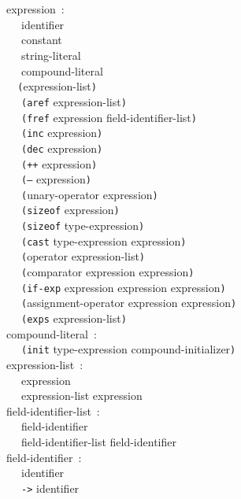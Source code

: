 \documentclass[a4]{article}
\def\|{\verb|} %|
\begin{document}
\noindent
expression{\rm \ :} \\
\|  | identifier \\
\|  | constant \\
\|  | string-literal \\
\|  | compound-literal \\
\|  | {\tt (}expression-list{\tt )} \\
\|  | {\tt (aref} expression-list{\tt )} \\
\|  | {\tt (fref} expression field-identifier-list{\tt )} \\
\|  | {\tt (inc} expression{\tt )} \\
\|  | {\tt (dec} expression{\tt )} \\
\|  | {\tt (++} expression{\tt )} \\
\|  | {\tt (--} expression{\tt )} \\
\|  | {\tt (}unary-operator expression{\tt )} \\
\|  | {\tt (sizeof} expression{\tt )} \\
\|  | {\tt (sizeof} type-expression{\tt )} \\
\|  | {\tt (cast} type-expression expression{\tt )} \\
\|  | {\tt (}operator expression-list{\tt )} \\
\|  | {\tt (}comparator expression expression{\tt )} \\
\|  | {\tt (if-exp} expression expression expression{\tt )} \\
\|  | {\tt (}assignment-operator expression expression{\tt )} \\
\|  | {\tt (exps} expression-list{\tt )} \\

\noindent
compound-literal{\rm \ :} \\
\|  | {\tt (init} type-expression compound-initializer{\tt )} \\

\noindent
expression-list{\rm \ :} \\
\|  | expression \\
\|  | expression-list expression \\

\noindent
field-identifier-list{\rm \ :} \\
\|  | field-identifier \\
\|  | field-identifier-list field-identifier \\

\noindent
field-identifier{\rm \ :} \\
\|  | identifier \\
\|  | {\tt ->} identifier \\
\end{document}
